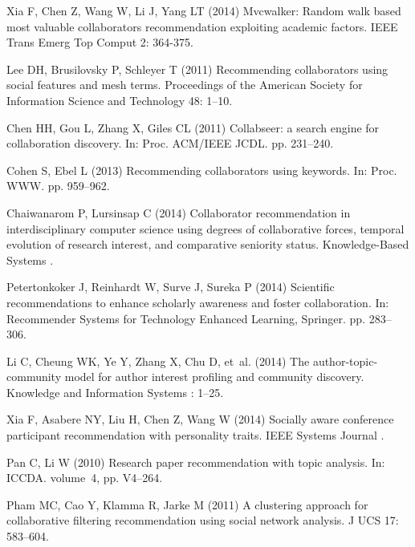 \documentclass[10pt]{article}
\begin{document}
\begin{thebibliography}{10}
Xia F, Chen Z, Wang W, Li J, Yang LT (2014) Mvcwalker: Random walk based most
  valuable collaborators recommendation exploiting academic factors.
\newblock IEEE Trans Emerg Top Comput 2: 364-375.

Lee DH, Brusilovsky P, Schleyer T (2011) Recommending collaborators using
  social features and mesh terms.
\newblock Proceedings of the American Society for Information Science and
  Technology 48: 1--10.

Chen HH, Gou L, Zhang X, Giles CL (2011) Collabseer: a search engine for
  collaboration discovery.
\newblock In: Proc. ACM/IEEE JCDL. pp. 231--240.

Cohen S, Ebel L (2013) Recommending collaborators using keywords.
\newblock In: Proc. WWW. pp. 959--962.

Chaiwanarom P, Lursinsap C (2014) Collaborator recommendation in
  interdisciplinary computer science using degrees of collaborative forces,
  temporal evolution of research interest, and comparative seniority status.
\newblock Knowledge-Based Systems .

Petertonkoker J, Reinhardt W, Surve J, Sureka P (2014) Scientific
  recommendations to enhance scholarly awareness and foster collaboration.
\newblock In: Recommender Systems for Technology Enhanced Learning, Springer.
  pp. 283--306.

Li C, Cheung WK, Ye Y, Zhang X, Chu D, et~al. (2014) The author-topic-community
  model for author interest profiling and community discovery.
\newblock Knowledge and Information Systems : 1--25.

Xia F, Asabere NY, Liu H, Chen Z, Wang W (2014) Socially aware conference
  participant recommendation with personality traits.
\newblock IEEE Systems Journal .

Pan C, Li W (2010) Research paper recommendation with topic analysis.
\newblock In: ICCDA. volume~4, pp. V4--264.

Pham MC, Cao Y, Klamma R, Jarke M (2011) A clustering approach for
  collaborative filtering recommendation using social network analysis.
\newblock J UCS 17: 583--604.


\end{thebibliography}
\end{document}
